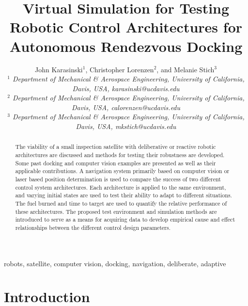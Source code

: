\documentclass[journal, 10pt]{IEEEtran}
\begin{document}
\title{Virtual Simulation for Testing Robotic Control Architectures for Autonomous Rendezvous Docking }

\author{John Karasinski$^1$, Christopher Lorenzen$^2$, and Melanie Stich$^3$\\\textit{$^1$ Department of Mechanical \& Aerospace Engineering, University of California, Davis, USA, karasinski@ucdavis.edu}
\\\textit{$^2$ Department of Mechanical \& Aerospace Engineering, University of California, Davis, USA, calorenzen@ucdavis.edu}\\\textit{$^3$ Department of Mechanical \& Aerospace Engineering, University of California, Davis, USA, mkstich@ucdavis.edu}
}

\maketitle

\begin{abstract}
The viability of a small inspection satellite with deliberative or reactive robotic architectures are discussed and methods for testing their robustness are developed.  Some past docking and computer vision examples are presented as well as their applicable contributions.  A navigation system primarily based on computer vision or laser based position determination is used to compare the success of two different control system architectures.  Each architecture is applied to the same environment, and varying initial states are used to test their ability to adapt to different situations.  The fuel burned and time to target are used to quantify the relative performance of these architectures.  The proposed test environment and simulation methods are introduced to serve as a means for acquiring data to develop empirical cause and effect relationships between the different control design parameters.
\end{abstract}

\begin{IEEEkeywords}
robots, satellite, computer vision, docking, navigation, deliberate, adaptive
\end{IEEEkeywords}

\section{Introduction}
\end{document}
